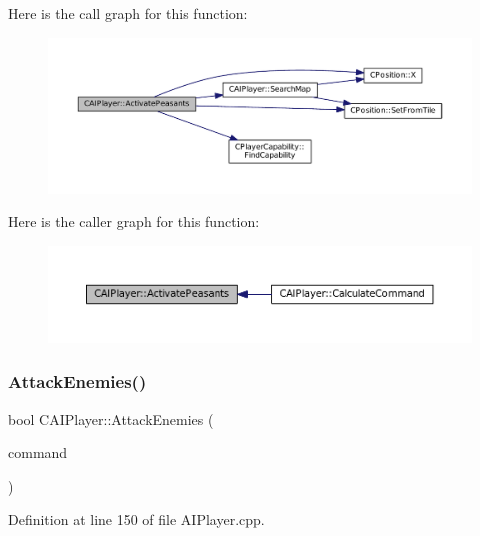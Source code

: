 Here is the call graph for this function\+:
\nopagebreak
\begin{figure}[H]
\begin{center}
\leavevmode
\includegraphics[width=350pt]{classCAIPlayer_a3fab1c955fd68bb53fa80bb1872d2819_cgraph}
\end{center}
\end{figure}
Here is the caller graph for this function\+:
\nopagebreak
\begin{figure}[H]
\begin{center}
\leavevmode
\includegraphics[width=350pt]{classCAIPlayer_a3fab1c955fd68bb53fa80bb1872d2819_icgraph}
\end{center}
\end{figure}
\hypertarget{classCAIPlayer_adf7feeba7debf9f19b000887616d7bfb}{}\label{classCAIPlayer_adf7feeba7debf9f19b000887616d7bfb} 
\subsubsection{\texorpdfstring{Attack\+Enemies()}{AttackEnemies()}}
{\footnotesize\ttfamily bool C\+A\+I\+Player\+::\+Attack\+Enemies (\begin{DoxyParamCaption}\item[{\hyperlink{structSPlayerCommandRequest}{S\+Player\+Command\+Request} \&}]{command }\end{DoxyParamCaption})\hspace{0.3cm}{\ttfamily [protected]}}



Definition at line 150 of file A\+I\+Player.\+cpp.


